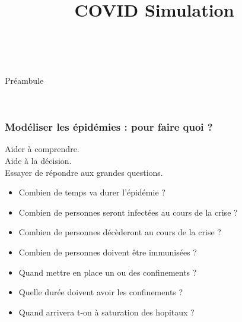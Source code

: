 \documentclass[a4paper]{cours-bdd}
\title{COVID Simulation}
\begin{document}
\frame{\titlepage}




\begin{frame}
  \hfill \
  \begin{center}
    \Huge
    Préambule
  \end{center}
  \hfill \

\end{frame}




\begin{frame}[fragile]
  \frametitle{Modéliser les épidémies : pour faire quoi ?}

  Aider à comprendre.\\
  Aide à la décision.\\
  Essayer de répondre aux grandes questions. \\
  \begin{itemize}
  \item Combien de temps va durer l’épidémie ?
  \item Combien de personnes seront infectées au cours de la crise ? 
  \item Combien de personnes décèderont au cours de la crise ? 
  \item Combien de personnes doivent être immunisées ?
  \item Quand mettre en place un ou des confinements ?
  \item Quelle durée doivent avoir les confinements ?
  \item Quand arrivera t-on à saturation des hopitaux ?
  \end{itemize}
  
\end{frame}

  
\end{document}
